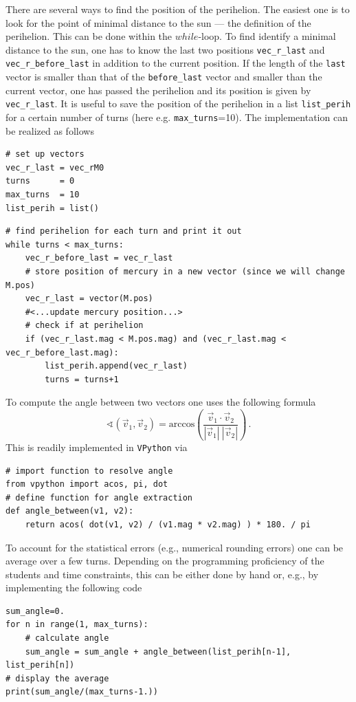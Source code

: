 \documentclass[12pt, UK english]{iopart}
\begin{document}
There are several ways to find the position of the perihelion.
The easiest one is to look for the point of minimal distance to the sun --- the definition of the perihelion.
This can be done within the $while$-loop.
To find identify a minimal distance to the sun, one has to know the last two positions \texttt{vec\_r\_last} and \texttt{vec\_r\_before\_last} in addition to the current position.
If the length of the \texttt{last} vector is smaller than that of the \texttt{before\_last} vector and smaller than the current vector, one has passed the perihelion and its position is given by \texttt{vec\_r\_last}.
It is useful to save the position of the perihelion in a list \texttt{list\_perih} for a certain number of turns (here e.g. \texttt{max\_turns}=10).
The implementation can be realized as follows
\begin{lstlisting}
# set up vectors
vec_r_last = vec_rM0
turns      = 0
max_turns  = 10
list_perih = list()
\end{lstlisting}
\begin{lstlisting}
# find perihelion for each turn and print it out
while turns < max_turns:
	vec_r_before_last = vec_r_last
	# store position of mercury in a new vector (since we will change M.pos)
	vec_r_last = vector(M.pos)
	#<...update mercury position...>
	# check if at perihelion
	if (vec_r_last.mag < M.pos.mag) and (vec_r_last.mag < vec_r_before_last.mag):
		list_perih.append(vec_r_last)
		turns = turns+1
\end{lstlisting}
To compute the angle between two vectors one uses the following
formula
 \begin{equation}
 	\sphericalangle(\vec{v}_{1},\vec{v}_2) = \mathrm{arccos} \left( \frac{\vec{v}_{1} \cdot \vec{v}_2}{|\vec{v}_{1}|\:|\vec{v}_2|} \right)
	\, .
 \end{equation}
This is readily implemented in \texttt{VPython} via
\begin{lstlisting}
# import function to resolve angle
from vpython import acos, pi, dot
# define function for angle extraction
def angle_between(v1, v2):
	return acos( dot(v1, v2) / (v1.mag * v2.mag) ) * 180. / pi
\end{lstlisting}
To account for the statistical errors (e.g., numerical rounding errors) one can be average over a few turns.
Depending on the programming proficiency of the students and time constraints, this can be either done by hand or, e.g., by implementing the following code
\begin{lstlisting}
sum_angle=0.
for n in range(1, max_turns):
	# calculate angle
	sum_angle = sum_angle + angle_between(list_perih[n-1], list_perih[n])
# display the average
print(sum_angle/(max_turns-1.))
\end{lstlisting}
\end{document}
